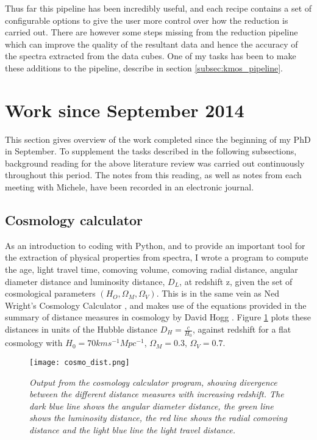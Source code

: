 \documentclass{literature}
\begin{document}
Thus far this pipeline has been incredibly useful, and each recipe contains a set of configurable options to give the user more control over how the reduction is carried out. There are however some steps missing from the reduction pipeline which can improve the quality of the resultant data and hence the accuracy of the spectra extracted from the data cubes. One of my tasks has been to make these additions to the pipeline, describe in section \ref{subsec:kmos_pipeline}.  




\section{Work since September 2014}\label{sec:work}
This section gives overview of the work completed since the beginning of my PhD in September. To supplement the tasks described in the following subsections, background reading for the above literature review was carried out continuously throughout this period. The notes from this reading, as well as notes from each meeting with Michele, have been recorded in an electronic journal. 

\subsection{Cosmology calculator}\label{subsec:cosmo_calc}
As an introduction to coding with Python, and to provide an important tool for the extraction of physical properties from spectra, I wrote a program to compute the age, light travel time, comoving volume, comoving radial distance, angular diameter distance and luminosity distance, $D_{L}$, at redshift z, given the set of cosmological parameters $(H_{O}, \Omega _{M}, \Omega _{V})$. This is in the same vein as Ned Wright's Cosmology Calculator \citep{Wright2006}, and makes use of the equations provided in the summary of distance measures in cosmology by David Hogg \citep{Hogg1999}. Figure \ref{fig:cosmo_calc} plots these distances in units of the Hubble distance $D_{H} = \frac{c}{H_{0}}$, against redshift for a flat cosmology with $H_{0} = 70kms^{-1}Mpc^{-1}$, $\Omega _{M} = 0.3$, $\Omega _{V} = 0.7$.  

\begin{figure}[!htp]
\centering
\texttt{[image: cosmo\_dist.png]}
\caption{\footnotesize{\emph{Output from the cosmology calculator program, showing divergence between the different distance measures with increasing redshift. The dark blue line shows the angular diameter distance, the green line shows the luminosity distance, the red line shows the radial comoving distance and the light blue line the light travel distance.}}}
\label{fig:cosmo_calc}
\end{figure}    
\end{document}
